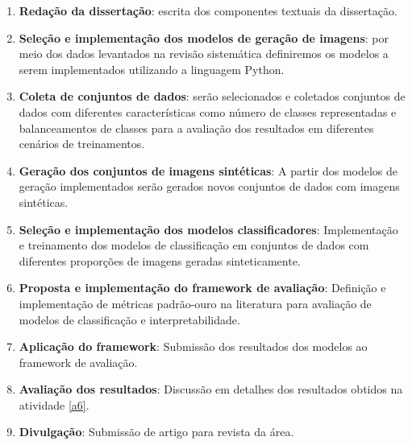 \begin{enumerate}
    \item \label{a0} \textbf{Redação da dissertação}: escrita dos componentes textuais da dissertação.

    \item \label{a1} \textbf{Seleção e implementação dos modelos de geração de imagens}: por meio dos dados levantados na revisão sistemática definiremos os modelos a serem implementados utilizando a linguagem Python.
    
    \item \label{a2} \textbf{Coleta de conjuntos de dados}: serão selecionados e coletados conjuntos de dados com diferentes características como número de classes representadas e balanceamentos de classes para a avaliação dos resultados em diferentes cenários de treinamentos.
    
    \item \label{a3} \textbf{Geração dos conjuntos de imagens sintéticas}: A partir dos modelos de geração implementados serão gerados novos conjuntos de dados com imagens sintéticas.
    
    \item \label{a4} \textbf{Seleção e implementação dos modelos classificadores}: Implementação e treinamento dos modelos de classificação em conjuntos de dados com diferentes proporções de imagens geradas sinteticamente. 

    \item \label{a5} \textbf{Proposta e implementação do framework de avaliação}: Definição e implementação de métricas padrão-ouro na literatura para avaliação de modelos de classificação e interpretabilidade.
    
    \item \label{a6} \textbf{Aplicação do framework}: Submissão dos resultados dos modelos ao framework de avaliação.
    
    \item \label{a7} \textbf{Avaliação dos resultados}: Discussão em detalhes dos resultados obtidos na atividade \ref{a6}.
    
    \item \label{a8} \textbf{Divulgação}: Submissão de artigo para revista da área.
\end{enumerate}


\newpage

